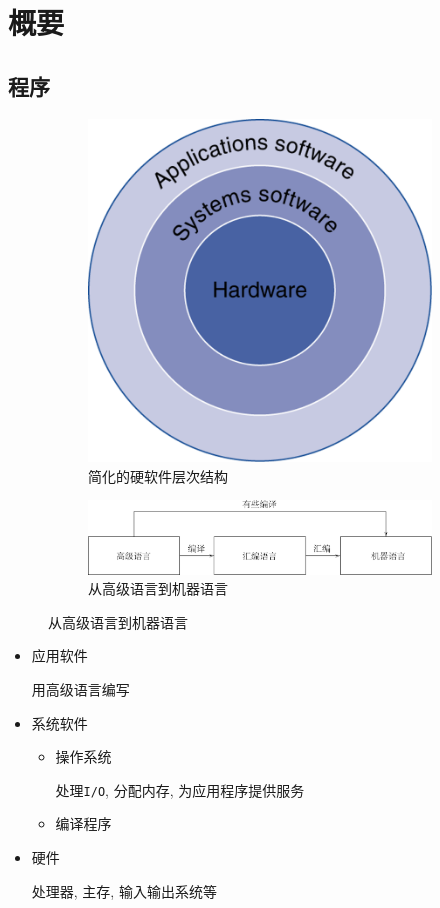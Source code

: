 \chapter{概要}
\section{程序}
\begin{figure}[H]
\centering
\begin{subfigure}{.48\textwidth}
\centering
\includegraphics[scale=.6]{img/figure17.png}
\caption{简化的硬软件层次结构}
\end{subfigure}
\begin{subfigure}{.48\textwidth}
\centering
\includegraphics[scale=.3]{img/figure18.pdf}
\caption{从高级语言到机器语言}
\end{subfigure}
\end{figure}
\begin{itemize}
\item 应用软件 \par 用高级语言编写
\item 系统软件
\begin{itemize}
\item 操作系统 \par 处理\verb|I/O|, 分配内存, 为应用程序提供服务
\item 编译程序
\end{itemize}
\item 硬件 \par 处理器, 主存, 输入输出系统等
\end{itemize}
